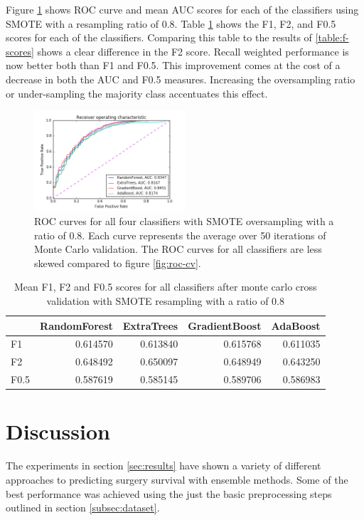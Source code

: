 \documentclass[journal]{IEEEtran}
\begin{document}
Figure \ref{fig:roc-smote} shows ROC curve and mean AUC scores for each of the classifiers using SMOTE with a resampling ratio of 0.8. Table \ref{table:f-score-smote} shows the F1, F2, and F0.5 scores for each of the classifiers. Comparing this table to the results of \ref{table:f-scores} shows a clear difference in the F2 score. Recall weighted performance is now better both than F1 and F0.5. This improvement comes at the cost of a decrease in both the AUC and F0.5 measures. Increasing the oversampling ratio or under-sampling the majority class accentuates this effect.

\begin{figure}[!t]
\centering
\includegraphics[width=0.5\textwidth]{../src/img/roc_smote.png}
\caption{ROC curves for all four classifiers with SMOTE oversampling with a ratio of 0.8. Each curve represents the average over 50 iterations of Monte Carlo validation. The ROC curves for all classifiers are less skewed compared to figure \ref{fig:roc-cv}.}
\label{fig:roc-smote}
\end{figure}

\begin{table}
\caption{Mean F1, F2 and F0.5 scores for all classifiers after monte carlo cross validation with SMOTE resampling with a ratio of 0.8}
\begin{tabular}{lrrrr}
{} &  RandomForest &  ExtraTrees &  GradientBoost &  AdaBoost \\
\hline
F1   &      0.614570 &    0.613840 &       0.615768 &  0.611035 \\
F2   &      0.648492 &    0.650097 &       0.648949 &  0.643250 \\
F0.5 &      0.587619 &    0.585145 &       0.589706 &  0.586983 \\
\end{tabular}
\label{table:f-score-smote}
\end{table}

\section{Discussion}
\label{sec:discussion}
The experiments in section \ref{sec:results} have shown a variety of different approaches to predicting surgery survival with ensemble methods. Some of the best performance was achieved using the just the basic preprocessing steps outlined in section \ref{subsec:dataset}.
\end{document}
